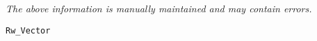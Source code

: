 \label{pkg:rw\_vector}

{\tiny \it The above information is manually maintained and may contain errors.}
\begin{verbatim}
Rw_Vector
\end{verbatim}
